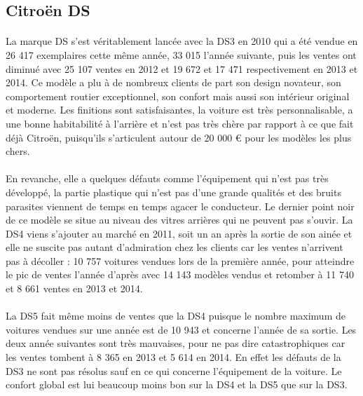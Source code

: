 \documentclass[12pt]{article}\usepackage[]{graphicx}\usepackage[]{color}
\begin{document}
\subsection{Citroën DS}

\paragraph{} La marque DS s'est véritablement lancée avec la DS3 en 2010 qui a
été vendue en 26 417 exemplaires cette même année, 33 015 l'année suivante,
puis les ventes ont diminué avec 25 107 ventes en 2012 et 19 672 et 17 471
respectivement en 2013 et 2014. Ce modèle a plu à de nombreux clients de part
son design novateur\cite{avis}, son comportement routier exceptionnel, son
confort mais aussi son intérieur original et moderne. Les finitions sont
satisfaisantes, la voiture est très personnalisable, a une bonne habitabilité à
l'arrière et n'est pas très chère par rapport à ce que fait déjà Citroën,
puisqu'ils s'articulent autour de 20 000 € pour les modèles les plus chers.

\paragraph{} En revanche, elle a quelques défauts comme l'équipement qui n'est
pas très développé, la partie plastique qui n'est pas d'une grande qualités et
des bruits parasites viennent de temps en temps agacer le conducteur. Le
dernier point noir de ce modèle se situe au niveau des vitres arrières qui ne
peuvent pas s'ouvir. La DS4 viens s'ajouter au marché en 2011, soit un an après
la sortie de son ainée et elle ne suscite pas autant d'admiration chez les
clients car les ventes n'arrivent pas à décoller : 10 757 voitures vendues lors
de la première année, pour atteindre le pic de ventes l'année d'après avec 14
143 modèles vendus et retomber à 11 740 et 8 661 ventes en 2013 et 2014.

\paragraph{} La DS5 fait même moins de ventes que la DS4 puisque le nombre
maximum de voitures vendues sur une année est de 10 943 et concerne l'année de
sa sortie. Les deux année suivantes sont très mauvaises, pour ne pas dire
catastrophiques car les ventes tombent à 8 365 en 2013 et 5 614 en 2014. En
effet les défauts de la DS3 ne sont pas résolus sauf en ce qui concerne
l'équipement de la voiture. Le confort global est lui beaucoup moins bon sur la
DS4 et la DS5 que sur la DS3.
\end{document}
